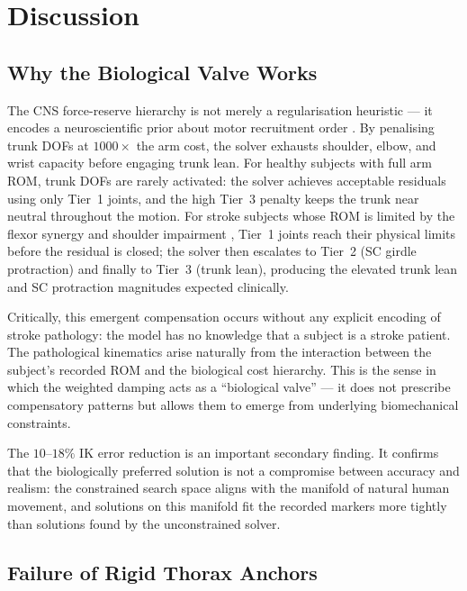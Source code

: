 \documentclass[journal,10pt,twocolumn]{IEEEtran}
\begin{document}
\section{Discussion}

\subsection{Why the Biological Valve Works}

The CNS force-reserve hierarchy is not merely a regularisation heuristic ---
it encodes a neuroscientific prior about motor recruitment order
\cite{cirstea2000}. By penalising trunk DOFs at $1000\times$ the arm cost, the
solver exhausts shoulder, elbow, and wrist capacity before engaging trunk lean.
For healthy subjects with full arm ROM, trunk DOFs are rarely activated: the
solver achieves acceptable residuals using only Tier~1 joints, and the
high Tier~3 penalty keeps the trunk near neutral throughout the motion.
For stroke subjects whose ROM is limited by the flexor synergy and
shoulder impairment \cite{dewald1995}, Tier~1 joints reach their physical
limits before the residual is closed; the solver then escalates to Tier~2
(SC girdle protraction) and finally to Tier~3 (trunk lean), producing the
elevated trunk lean and SC protraction magnitudes expected clinically.

Critically, this emergent compensation occurs without any explicit encoding
of stroke pathology: the model has no knowledge that a subject is a stroke
patient. The pathological kinematics arise naturally from the interaction
between the subject's recorded ROM and the biological cost hierarchy.
This is the sense in which the weighted damping acts as a ``biological
valve'' --- it does not prescribe compensatory patterns but allows them to
emerge from underlying biomechanical constraints.

The $10$--$18\%$ IK error reduction is an important secondary finding.
It confirms that the biologically preferred solution is not a
compromise between accuracy and realism: the constrained search space
aligns with the manifold of natural human movement, and solutions on this
manifold fit the recorded markers more tightly than solutions found by the
unconstrained solver.

\subsection{Failure of Rigid Thorax Anchors}
\label{sec:sternum}
\end{document}
